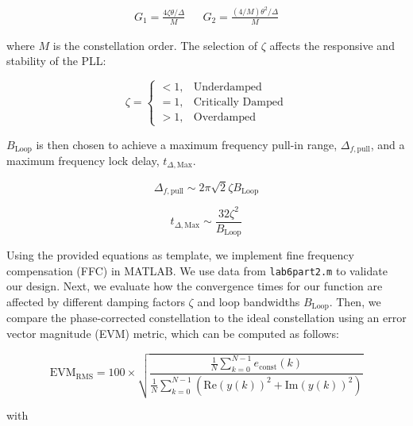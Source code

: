 \documentclass{article}
\begin{document}
\begin{align}
	G_1 = \frac{4\zeta\theta/\Delta}{M} && G_2 = \frac{(4/M)\theta^2/\Delta}{M}
\end{align}

\noindent where $M$ is the constellation order. The selection of $\zeta$ affects the responsive and stability of the PLL:

\begin{equation}
\zeta = \begin{cases}
< 1, & \text{Underdamped}\\
= 1, & \text{Critically Damped}\\
> 1, & \text{Overdamped}
\end{cases}
\end{equation}

\noindent $B_\text{Loop}$ is then chosen to achieve a maximum frequency pull-in range, $\Delta_{f,\text{pull}}$, and a maximum frequency lock delay, $t_{\Delta,\text{Max}}$.


\begin{equation}
	\label{eq::max_freq_correct}
	\Delta_{f,\text{pull}} \sim 2\pi\sqrt{2}\zeta{B_\text{Loop}}\end{equation}

\begin{equation}
	t_{\Delta,\text{Max}} \sim \frac{32\zeta^2}{B_\text{Loop}}\end{equation}
	
Using the provided equations as template, we implement fine frequency compensation (FFC) in MATLAB. We use data from \texttt{lab6part2.m} to validate our design. Next, we evaluate how the convergence times for our function are affected by different damping factors $\zeta$ and loop bandwidths $B_\text{Loop}$. Then, we compare the phase-corrected constellation to the ideal constellation using an error vector magnitude (EVM) metric, which can be computed as follows:

\begin{equation}
	\text{EVM}_\text{RMS} = 100 \times \sqrt{\frac{\frac{1}{N}\sum_{k=0}^{N-1}{e_\text{const}(k)}}{\frac{1}{N}\sum_{k=0}^{N-1}{(\text{Re}(y(k))^2 + \text{Im}(y(k))^2)}}}
\end{equation}

\noindent with
\end{document}
